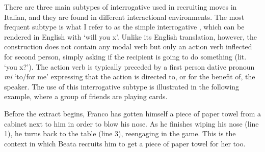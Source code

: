 \documentclass[output=paper,modfonts]{langscibook}
\begin{document}
There are three main subtypes of interrogative used in recruiting moves in Italian, and they are found in different interactional environments. The most frequent subtype is what I refer to as the simple interrogative \citep[chap. 3]{Rossi2015a}, which can be rendered in English with ‘will you x’. Unlike its English translation, however, the construction does not contain any modal verb but only an action verb inflected for second person, simply asking if the recipient is going to do something (lit. ‘you x?’). The action verb is typically preceded by a first person dative pronoun \textit{mi} ‘to/for me’ expressing that the action is directed to, or for the benefit of, the speaker. The use of this interrogative subtype is illustrated in the following example, where a group of friends are playing cards.

Before the extract begins, Franco has gotten himself a piece of paper towel from a cabinet next to him in order to blow his nose. As he finishes wiping his nose (line 1), he turns back to the table (line 3), reengaging in the game. This is the context in which Beata recruits him to get a piece of paper towel for her too.
\end{document}
